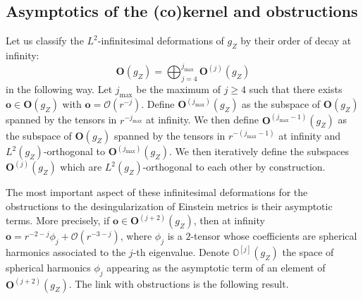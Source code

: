 \documentclass[12pt]{article}
\begin{document}
   \subsection{Asymptotics of the (co)kernel and obstructions}
   
   Let us classify the $L^2$-infinitesimal deformations of ${g_Z}$ by their order of decay at infinity:
   $$ \mathbf{O}({g_Z}) = \bigoplus_{j = 4}^{j_{\max}} \mathbf{O}^{(j)}({g_Z}) $$
   in the following way. Let $j_{\max}$ be the maximum of $j\geqslant 4$ such that there exists $\mathbf{o}\in \mathbf{O}({g_Z})$ with $ \mathbf{o} = \mathcal{O}(r^{-j}) $. Define $\mathbf{O}^{(j_{\max})}({g_Z})$ as the subspace of $\mathbf{O}({g_Z})$ spanned by the tensors in $r^{-j_{\max}}$ at infinity. We then define $\mathbf{O}^{(j_{\max}-1)}({g_Z})$ as the subspace of $\mathbf{O}({g_Z})$ spanned by the tensors in $r^{-(j_{\max}- 1)}$ at infinity and $L^2({g_Z})$-orthogonal to $\mathbf{O}^{(j_{\max})}({g_Z})$. We then iteratively define the subspaces $\mathbf{O}^{(j)}({g_Z})$ which are $L^2({g_Z})$-orthogonal to each other by construction.
   
   The most important aspect of these infinitesimal deformations for the obstructions to the desingularization of Einstein metrics is their asymptotic terms. More precisely, if $\mathbf{o}\in \mathbf{O}^{(j+2)}({g_Z})$, then at infinity $\mathbf{o} = r^{-2-j} \phi_{j} + \mathcal{O}(r^{-3-j})$, where $\phi_{j}$ is a $2$-tensor whose coefficients are spherical harmonics associated to the $j$-th eigenvalue. Denote 
   $ \mathbb{O}^{[j]}({g_Z}) $ the space of spherical harmonics $\phi_{j}$ appearing as the asymptotic term of an element of $\mathbf{O}^{(j+2)}({g_Z})$. The link with obstructions is the following result.
   
\end{document}
